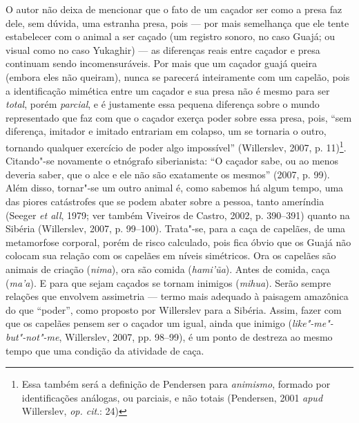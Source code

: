 O autor não deixa de mencionar que o fato de um caçador ser como a presa
faz dele, sem dúvida, uma estranha presa, pois --- por mais semelhança que
ele tente estabelecer com o animal a ser caçado (um registro sonoro, no
caso Guajá; ou visual como no caso Yukaghir) --- as diferenças reais entre
caçador e presa continuam sendo incomensuráveis. Por mais que um caçador
guajá queira (embora eles não queiram), nunca se parecerá inteiramente
com um capelão, pois a identificação mimética entre um caçador e sua
presa não é mesmo para ser \emph{total}, porém \emph{parcial}, e é
justamente essa pequena diferença sobre o mundo representado que faz com
que o caçador exerça poder sobre essa presa, pois, ``sem diferença,
imitador e imitado entrariam em colapso, um se tornaria o outro,
tornando qualquer exercício de poder algo impossível'' (Willerslev, 2007,
p. 11)\footnote{Essa também será a definição de Pendersen para
  \emph{animismo}, formado por identificações análogas, ou parciais, e
  não totais (Pendersen, 2001 \emph{apud} Willerslev, \emph{op. cit}.: 24)}.
Citando"-se novamente o etnógrafo siberianista: ``O caçador sabe, ou ao
menos deveria saber, que o alce e ele não são exatamente os mesmos''
(2007, p. 99). Além disso, tornar"-se um outro animal é, como sabemos há
algum tempo, uma das piores catástrofes que se podem abater sobre a
pessoa, tanto ameríndia (Seeger \emph{et all}, 1979; ver também Viveiros
de Castro, 2002, p. 390--391) quanto na Sibéria (Willerslev, 2007,
p. 99--100). Trata"-se, para a caça de capelães, de uma metamorfose
corporal, porém de risco calculado, pois fica óbvio que os Guajá não
colocam sua relação com os capelães em níveis simétricos. Ora os
capelães são animais de criação (\emph{nima}), ora são comida
(\emph{hami'ũa}). Antes de comida, caça (\emph{ma'a}). E para que sejam
caçados se tornam inimigos (\emph{mihua}). Serão sempre relações que
envolvem assimetria --- termo mais adequado à paisagem amazônica do que
``poder'', como proposto por Willerslev para a Sibéria. Assim, fazer com
que os capelães pensem ser o caçador um igual, ainda que inimigo
(\emph{like"-me"-but"-not"-me}, Willerslev, 2007, pp. 98--99), é um ponto de
destreza ao mesmo tempo que uma condição da atividade de caça.

